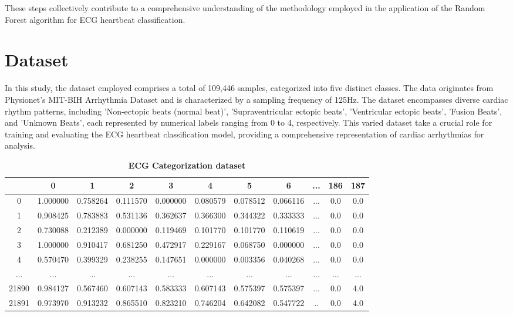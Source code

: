 \documentclass[conference]{IEEEtran}
\begin{document}
These steps collectively contribute to a comprehensive understanding of the methodology employed in the application of the Random Forest algorithm for ECG heartbeat classification.

\section{Dataset}
In this study, the dataset employed comprises a total of 109,446 samples, categorized into five distinct classes. The data originates from Physionet's MIT-BIH Arrhythmia Dataset and is characterized by a sampling frequency of 125Hz. The dataset encompasses diverse cardiac rhythm patterns, including 'Non-ectopic beats (normal beat)', 'Supraventricular ectopic beats', 'Ventricular ectopic beats', 'Fusion Beats', and 'Unknown Beats', each represented by numerical labels ranging from 0 to 4, respectively. This varied dataset take a crucial role for training and evaluating the ECG heartbeat classification model, providing a comprehensive representation of cardiac arrhythmias for analysis.

\begin{table}[ht]
\centering
\begin{tabular}{|c|cccccccccc|}
\hline
\multicolumn{1}{|c|}{} & 0& 1& 2& 3& 4& 5& 6& ...& 186& 187\\ \hline
0 & 1.000000& 0.758264& 0.111570 & 0.000000 &0.080579  &0.078512 &0.066116 &... &0.0 &0.0 \\ \hline
1 & 0.908425 & 0.783883	&0.531136&0.362637&0.366300&0.344322 &0.333333&...&0.0 &0.0 \\ \hline
2 & 0.730088 & 0.212389&0.000000&0.119469&0.101770&0.101770 &0.110619&...&0.0 &0.0 \\ \hline
3 &1.000000	&0.910417	&0.681250	&0.472917	&0.229167	&0.068750	&0.000000&...&0.0 &0.0 \\ \hline
4 &0.570470	&0.399329	&0.238255	&0.147651	&0.000000	&0.003356	&0.040268&...&0.0 &0.0\\ \hline
...& ... & ...&...&...&...&... &...&...&...& ...\\ \hline
21890&0.984127	&0.567460	&0.607143	&0.583333	&0.607143	&0.575397	&0.575397&...&0.0 &4.0\\ \hline
21891 &0.973970	&0.913232	&0.865510	&0.823210	&0.746204	&0.642082	&0.547722&..&0.0 &4.0 \\ \hline
\end{tabular}
\caption{\textbf{ECG Categorization dataset}}
\label{tab:my_table} %
\end{table}
\end{document}
